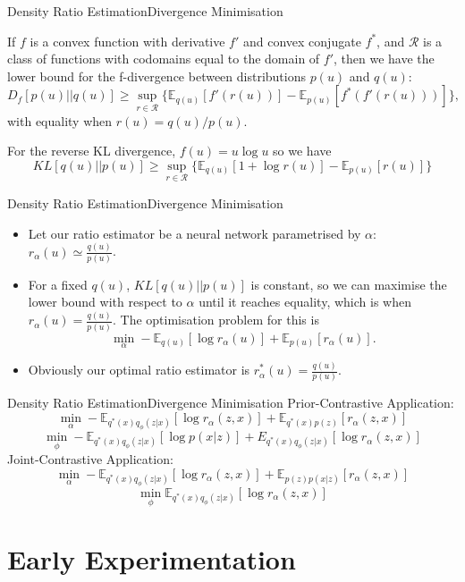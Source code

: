 \documentclass{beamer}
\newcommand{\E}{\mathbb{E}}
\begin{document}
\begin{frame}{Density Ratio Estimation}{Divergence Minimisation}
\begin{theorem}
If $f$ is a convex function with derivative $f'$ and convex conjugate $f^*$, and $\mathcal{R}$ is a class of functions with codomains equal to the domain of $f'$, then we have the lower bound for the f-divergence between distributions $p(u)$ and $q(u)$:
\[D_f [p(u)||q(u)]\geq \sup_{r\in \mathcal{R}} \{\mathbb{E}_{q(u)}[f'(r(u))]-\mathbb{E}_{p(u)}[f^*(f'(r(u)))]\},\]
with equality when $r(u)=q(u)/p(u)$.
\end{theorem}
For the reverse KL divergence, $f(u)=u\log u$ so we have
\[KL[q(u)||p(u)]\geq \sup_{r\in \mathcal{R}}\{\mathbb{E}_{q(u)}[1+\log r(u)]-\mathbb{E}_{p(u)}[r(u)]\}\]

\end{frame}
\begin{frame}{Density Ratio Estimation}{Divergence Minimisation}
\begin{itemize}
\item Let our ratio estimator be a neural network parametrised by $\alpha$: $r_\alpha(u)\simeq \frac{q(u)}{p(u)}$.
\item For a fixed $q(u)$, $KL[q(u)||p(u)]$ is constant, so we can maximise the lower bound with respect to $\alpha$ until it reaches equality, which is when $r_\alpha(u)=\frac{q(u)}{p(u)}$. The optimisation problem for this is
\[\min_\alpha -\mathbb{E}_{q(u)}[\log r_\alpha(u)]+\mathbb{E}_{p(u)}[r_\alpha(u)].\]
\item Obviously our optimal ratio estimator is $r^*_\alpha(u)=\frac{q(u)}{p(u)}$.
\end{itemize}
\end{frame}
\begin{frame}{Density Ratio Estimation}{Divergence Minimisation}
Prior-Contrastive Application:
\[\min_\alpha -\E_{q^*(x)q_\phi(z|x)}[\log r_\alpha(z,x)]+\E_{q^*(x)p(z)}[r_\alpha (z,x)]\]
\[\min_\phi -\mathbb{E}_{q^*(x)q_\phi(z|x)}\left[\log p(x|z)\right]+E_{q^*(x)q_\phi (z|x)}[\log r_\alpha(z,x)]\]
Joint-Contrastive Application:
\[\min_\alpha-\E_{q^*(x)q_\phi(z|x)}[\log r_\alpha(z,x)]+\E_{p(z)p(x|z)}[r_\alpha(z,x)]\]
\[\min_\phi \mathbb{E}_{q^*(x)q_\phi(z|x)}[\log r_\alpha(z,x)]\]
\end{frame}
\section{Early Experimentation}
\end{document}
